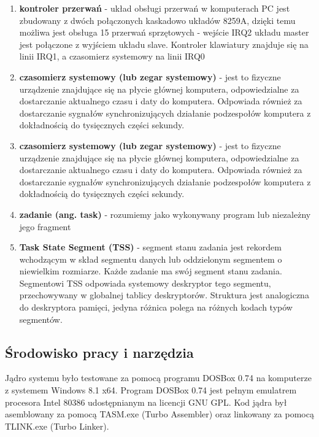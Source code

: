 \documentclass[a4paper,12pt]{article}
\begin{document}
\begin{enumerate}
\item{\textbf{kontroler przerwań} - układ obsługi przerwań w komputerach PC jest zbudowany z dwóch połączonych kaskadowo układów 8259A, dzięki temu możliwa jest obsługa 15 przerwań sprzętowych - wejście IRQ2 układu master jest połączone z wyjściem układu slave. Kontroler klawiatury znajduje się na linii IRQ1, a czasomierz systemowy na linii IRQ0}
				\item{\textbf{czasomierz systemowy (lub zegar systemowy)} - jest to fizyczne urządzenie znajdujące się na płycie głównej komputera, odpowiedzialne za dostarczanie aktualnego czasu i daty do komputera. Odpowiada również za dostarczanie sygnałów synchronizujących działanie podzespołów komputera z dokładnością do tysięcznych części sekundy.}

				\item{\textbf{czasomierz systemowy (lub zegar systemowy)} - jest to fizyczne urządzenie znajdujące się na płycie głównej komputera, odpowiedzialne za dostarczanie aktualnego czasu i daty do komputera. Odpowiada również za dostarczanie sygnałów synchronizujących działanie podzespołów komputera z dokładnością do tysięcznych części sekundy.}

\item{\textbf{zadanie (ang. task)} - rozumiemy jako wykonywany program lub niezależny jego fragment }

\item{\textbf{Task State Segment (TSS) } - segment stanu zadania jest rekordem wchodzącym w skład segmentu danych lub oddzielonym segmentem o niewielkim rozmiarze. Każde zadanie ma swój segment stanu zadania. Segmentowi TSS odpowiada systemowy deskryptor tego segmentu, przechowywany w globalnej tablicy deskryptorów. Struktura jest analogiczna do deskryptora pamięci, jedyna różnica polega na różnych kodach typów segmentów. }
			
\end{enumerate}




	\subsection{Środowisko pracy i narzędzia}
	Jądro systemu było testowane za pomocą programu DOSBox 0.74 na komputerze z systemem Windows 8.1 x64. Program DOSBox 0.74 jest pełnym emulatrem procesora Intel 80386 udostępnianym na licencji GNU GPL. Kod jądra był asemblowany za pomocą TASM.exe (Turbo Assembler) oraz linkowany za pomocą TLINK.exe (Turbo Linker). 
\end{document}
